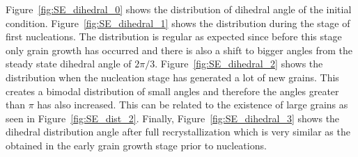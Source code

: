 Figure~\ref{fig:SE_dihedral_0} shows the distribution of dihedral angle of the initial condition. Figure~\ref{fig:SE_dihedral_1} shows the distribution during the stage of first nucleations. The distribution is regular as expected since before this stage only grain growth has occurred and there is also a shift to bigger angles from the steady state dihedral angle of $2\pi/3$. Figure~\ref{fig:SE_dihedral_2} shows the distribution when the nucleation stage has generated a lot of new grains. 
This creates a bimodal distribution of small angles and therefore the angles greater than $\pi$ has also increased. 
This can be related to the existence of large grains as seen in Figure~\ref{fig:SE_dist_2}. Finally, Figure~\ref{fig:SE_dihedral_3} shows the dihedral distribution angle after full recrystallization which is very similar as the obtained in the early grain growth stage prior to nucleations.

